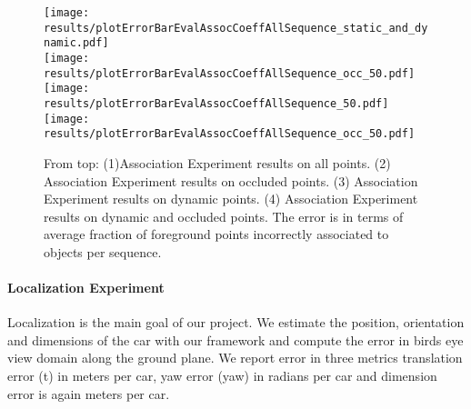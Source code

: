 \begin{figure*}
  \texttt{[image: results/plotErrorBarEvalAssocCoeffAllSequence\_static\_and\_dynamic.pdf]}\\
  \texttt{[image: results/plotErrorBarEvalAssocCoeffAllSequence\_occ\_50.pdf]}\\
  \texttt{[image: results/plotErrorBarEvalAssocCoeffAllSequence\_50.pdf]}\\
  \texttt{[image: results/plotErrorBarEvalAssocCoeffAllSequence\_occ\_50.pdf]}
  \caption{From top: (1)Association Experiment results on all points. %
    (2) Association Experiment results on occluded points. %
    (3) Association Experiment results on dynamic points. %
    (4) Association Experiment results on dynamic  and occluded points. The error is in terms of average fraction of foreground points incorrectly associated to objects per sequence. } \label{fig:assoc-occ-results}
\end{figure*}


\paragraph{Localization Experiment}
Localization is the main goal of our project. We estimate the position, orientation and dimensions of the car with our framework and compute the error in birds eye view domain along the ground plane. We report error in three metrics translation error (t) in meters per car, yaw error (yaw) in radians per car and dimension error is again meters per car.

